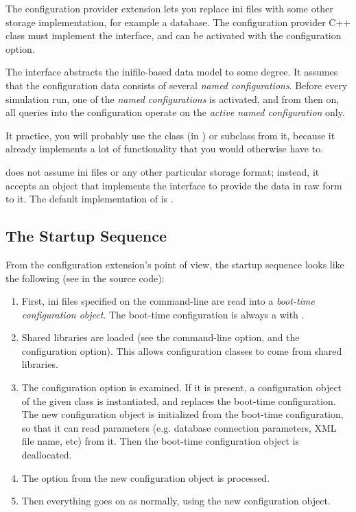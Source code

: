 The configuration provider extension lets you replace ini files
with some other storage implementation, for example a database.
The configuration provider C++ class must implement the
 interface, and can be activated with
the  configuration option.

The  interface abstracts the inifile-based
data model to some degree. It assumes that the configuration data
consists of several \textit{named configurations}. Before every
simulation run, one of the \textit{named configurations} is
activated, and from then on, all queries into the configuration
operate on the \textit{active named configuration} only.

It practice, you will probably use the 
class (in ) or subclass from it, because it already
implements a lot of functionality that you would otherwise have to.

 does not assume ini files or
any other particular storage format; instead, it accepts
an object that implements the 
interface to provide the data in raw form to it.
The default implementation of  is
.

\subsection{The Startup Sequence}

From the configuration extension's point of view, the startup sequence
looks like the following (see  in the source code):

\begin{enumerate}
  \item First, ini files specified on the command-line are read into a
     \textit{boot-time configuration object}. The boot-time configuration
     is always a  with
     .
  \item Shared libraries are loaded (see the  command-line option,
     and the  configuration option). This allows
     configuration classes to come from shared libraries.
  \item The  configuration option is examined.
     If it is present, a configuration object of the given class
     is instantiated, and replaces the boot-time configuration.
     The new configuration object is initialized from the boot-time
     configuration, so that it can read parameters (e.g. database
     connection parameters, XML file name, etc) from it.
     Then the boot-time configuration object is deallocated.
  \item The  option from the new configuration object is
     processed.
  \item Then everything goes on as normally, using the new configuration
     object.
\end{enumerate}


